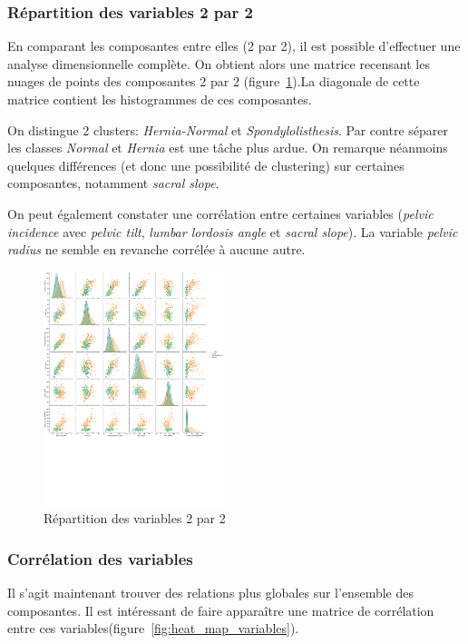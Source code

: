 \documentclass[twocolumn,10pt]{article}
\begin{document}
\subsubsection{Répartition des variables 2 par 2}

En comparant les composantes entre elles (2 par 2), il est possible d'effectuer une analyse dimensionnelle complète. On obtient alors une matrice recensant les nuages de points des composantes 2 par 2 (figure~\ref{fig:pairplot}).La diagonale de cette matrice contient les histogrammes de ces composantes.

On distingue 2 clusters: \textit{Hernia-Normal} et \textit{Spondylolisthesis}. Par contre séparer les classes \textit{Normal} et \textit{Hernia} est une tâche plus ardue. On remarque néanmoins quelques différences (et donc une possibilité de clustering) sur certaines composantes, notamment \textit{sacral slope}.

On peut également constater une corrélation entre certaines variables (\textit{pelvic incidence} avec \textit{pelvic tilt}, \textit{lumbar lordosis angle} et \textit{sacral slope}). La variable \textit{pelvic radius} ne semble en revanche corrélée à aucune autre.
\begin{figure}[htbp]
    \begin{center}
    \includegraphics[trim=0 8cm 0 0, width=0.47\textwidth]{figures/pairplot.pdf}
    \caption{\label{fig:pairplot}Répartition des variables 2 par 2 }
    \end{center}
\end{figure}

\subsubsection{Corrélation des variables}
Il s'agit maintenant trouver des relations plus globales sur l'ensemble des composantes. Il est intéressant de faire apparaître une matrice de corrélation entre ces variables(figure~\ref{fig:heat_map_variables}).
\end{document}
